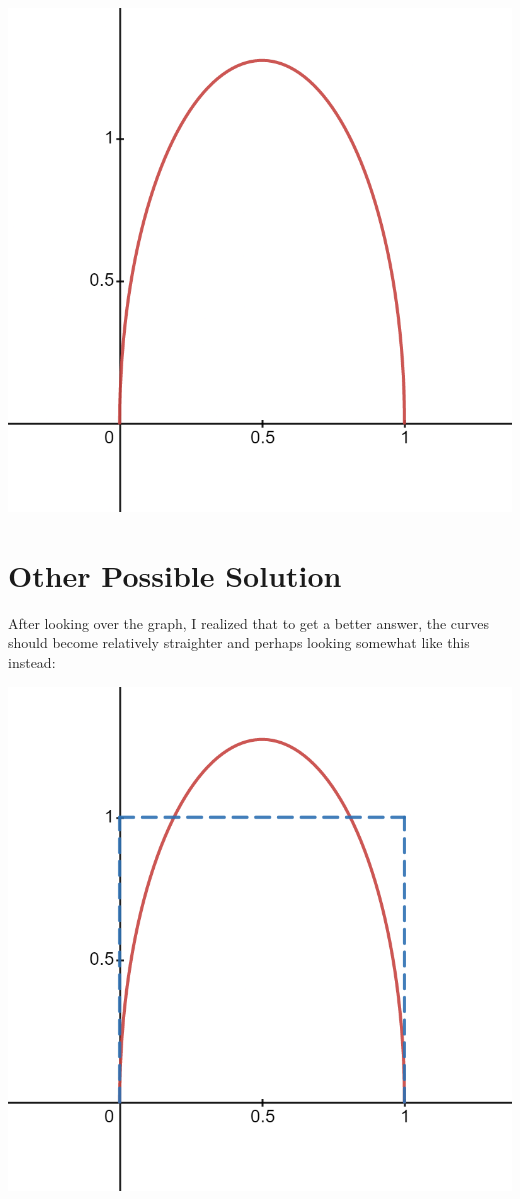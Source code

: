 \documentclass[letterpaper,12pt]{article}
\theoremstyle{definition}
\begin{document}
\begin{center}
    \includegraphics[scale=0.3]{halfellipse.png}
\end{center}

\pagebreak

\section*{Other Possible Solution}

After looking over the graph, I realized that to get a better answer, the curves should become relatively straighter and perhaps looking somewhat like this instead:

\begin{center}
    \includegraphics[scale=0.3]{projection.png}
\end{center}
\end{document}
